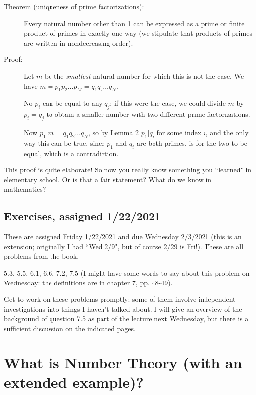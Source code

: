 \documentclass[12pt]{article}
\begin{document}
\begin{description}
\item[Theorem (uniqueness of prime factorizations):]  Every natural number other than 1 can be expressed as a prime or finite product of primes in exactly one way (we stipulate that products of primes are written in nondecreasing order).

\item[Proof:]  Let $m$ be the {\em smallest\/} natural number for which this is not the case.   We have
$m=p_1p_2\ldots p_M = q_1q_2\ldots q_N$.

No $p_i$ can be equal to any $q_j$:  if this were the case, we could divide $m$ by $p_i=q_j$ to obtain a smaller number with two different prime factorizations.

Now $p_1 | m=q_1q_2\ldots q_N$, so by Lemma 2 $p_1 | q_i$ for some index $i$, and the only way this can be true, since $p_1$ and $q_i$ are both primes, is for the two to be equal, which is a contradiction.



\end{description}

This proof is quite elaborate!    So now you really know something you ``learned" in elementary school.  Or is that a fair statement?  What do we know in mathematics?

\subsection{Exercises, assigned 1/22/2021}

These are assigned Friday 1/22/2021 and due Wednesday 2/3/2021 (this is an extension;  originally I had ``Wed 2/9", but of course 2/29 is Fri!).  These are all problems from the book.

5.3, 5.5, 6.1, 6.6, 7.2, 7.5 (I might have  some words to say about this problem on Wednesday:  the definitions are in chapter 7, pp. 48-49).

Get to work on these problems promptly:  some of them involve independent investigations into things I haven't talked about.  I will give an overview of the background of question 7.5
as part of the lecture next Wednesday, but there is a sufficient discussion on the indicated pages.

\section{What is Number Theory (with an extended example)?}
\end{document}
